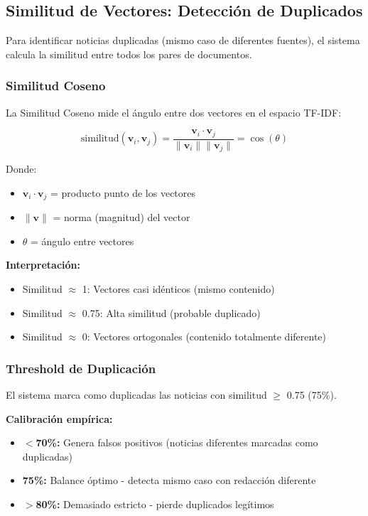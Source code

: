 \subsection{Similitud de Vectores: Detección de Duplicados}
\label{subsec:similitud_coseno}

Para identificar noticias duplicadas (mismo caso de diferentes fuentes), el sistema calcula la similitud entre todos los pares de documentos.

\subsubsection{Similitud Coseno}
\label{subsubsec:similitud_coseno}

La Similitud Coseno mide el ángulo entre dos vectores en el espacio TF-IDF:

\begin{equation}
\text{similitud}(\mathbf{v}_i, \mathbf{v}_j) = \frac{\mathbf{v}_i \cdot \mathbf{v}_j}{\|\mathbf{v}_i\| \|\mathbf{v}_j\|} = \cos(\theta)
\end{equation}

Donde:
\begin{itemize}
    \item $\mathbf{v}_i \cdot \mathbf{v}_j$ = producto punto de los vectores
    \item $\|\mathbf{v}\|$ = norma (magnitud) del vector
    \item $\theta$ = ángulo entre vectores
\end{itemize}

\textbf{Interpretación:}
\begin{itemize}
    \item Similitud $\approx$ 1: Vectores casi idénticos (mismo contenido)
    \item Similitud $\approx$ 0.75: Alta similitud (probable duplicado)
    \item Similitud $\approx$ 0: Vectores ortogonales (contenido totalmente diferente)
\end{itemize}

\subsubsection{Threshold de Duplicación}
\label{subsubsec:threshold_duplicados}

El sistema marca como duplicadas las noticias con similitud $\geq$ 0.75 (75\%).

\textbf{Calibración empírica:}
\begin{itemize}
    \item \textbf{$<$70\%:} Genera falsos positivos (noticias diferentes marcadas como duplicadas)
    \item \textbf{75\%:} Balance óptimo - detecta mismo caso con redacción diferente
    \item \textbf{$>$80\%:} Demasiado estricto - pierde duplicados legítimos
\end{itemize}

